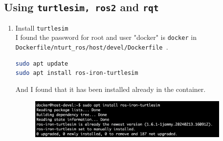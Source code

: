 \documentclass[12pt, a4paper]{article}
\begin{document}
\subsection{Using \texttt{turtlesim, ros2} and \texttt{rqt}}
\begin{enumerate}
	\item Install \texttt{turtlesim}\\
		I found the password for root and user "docker" is \texttt{docker} in \\\texttt{Dockerfile/nturt\_ros/host/devel/Dockerfile }.
\begin{lstlisting}[language=bash]
sudo apt update
sudo apt install ros-iron-turtlesim
\end{lstlisting}
And I found that it has been installed already in the container.\\
\begin{figure}[h]
	\setlength{\leftskip}{2.4em}
	\includegraphics[width=0.94\textwidth]{p1.2-1}
\end{figure}


\end{enumerate}
\end{document}
